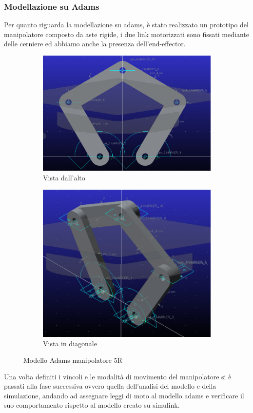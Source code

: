 \subsubsection*{Modellazione su Adams}
Per quanto riguarda la modellazione su adams, è stato realizzato un prototipo del manipolatore composto da aste rigide, i due link motorizzati sono fissati mediante delle cerniere ed abbiamo anche la presenza dell'end-effector.
\begin{figure}[!ht]
	\begin{subfigure}{.5\textwidth}
		\centering
		\includegraphics[width=.9\linewidth]{Immagini/Dinamica/adams1.png}  
		\caption{Vista dall'alto}
		\label{fig:sub-adams1}
	\end{subfigure}
	\begin{subfigure}{.5\textwidth}
		\centering
		\includegraphics[width=.8\linewidth]{Immagini/Dinamica/adams2.png}  
		\caption{Vista in diagonale}
		\label{fig:sub-adams2}
	\end{subfigure}
	\caption{Modello Adams manipolatore 5R}
\end{figure}
Una volta definiti i vincoli e le modalità di movimento del manipolatore si è passati alla fase successiva ovvero quella dell'analisi del modello e della simulazione, andando ad assegnare leggi di moto al modello adams e verificare il suo comportamento rispetto al modello creato su simulink.
